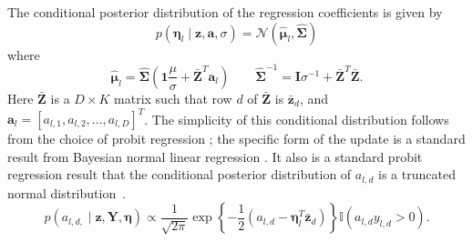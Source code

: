 The conditional posterior distribution of the regression coefficients is given by 
\begin{equation}
p(\boldsymbol\eta_{l}\mid\mathbf{z},\mathbf{a},\sigma) = \mathcal{N}(\hat{\boldsymbol\mu}_{l},\hat{\mathbf{\Sigma}})\label{eqn:regression_param_conditional}
\end{equation}
where
\begin{equation*}
\hat{\boldsymbol\mu}_{l}  =  \hat{\mathbf{\Sigma}}\left(\mathbf{1}\frac{\mu}{\sigma}+\bar{\mathbf{Z}}^{T}\mathbf{a}_{l}\right) \qquad \hat{\mathbf{\Sigma}}^{-1}  =  \mathbf{I}\sigma^{-1}+\bar{\mathbf{Z}}^{T}\bar{\mathbf{Z}}
.\end{equation*}
Here $\bar{\mathbf{Z}}$ is a $D\times K$ matrix
such that row $d$ of $\mathbf{\bar{Z}}$ is $\bar{\mathbf{z}}_{d}$, and $\mathbf{a}_{l}=[a_{l,1},a_{l,2},\ldots,a_{l,D}]^{T}$.  The simplicity of this conditional distribution follows from the choice of probit regression  \citep{Albert_Chib_1993}; the specific form of the update is a standard result from Bayesian normal  linear regression \citep{gelmanbda04}. 
It also is a standard probit regression result that the conditional posterior
distribution of $a_{l,d}$ is a truncated normal
distribution~\cite{Albert_Chib_1993}. 
\begin{equation}
p\left(a_{l,d,}\mid\mathbf{z},\mathbf{Y},\mathbf{\boldsymbol\eta}\right)\propto\frac{1}{\sqrt{2\pi}}\exp\left\{ -\frac{1}{2}\left(a_{l,d}-\boldsymbol\eta_{l}^{T}\mathbf{\bar{z}}_{d}\right)\right\} \mathbb{I}\left(a_{l,d}y_{l,d}>0\right).\label{eqn:a_l_d}\end{equation}

